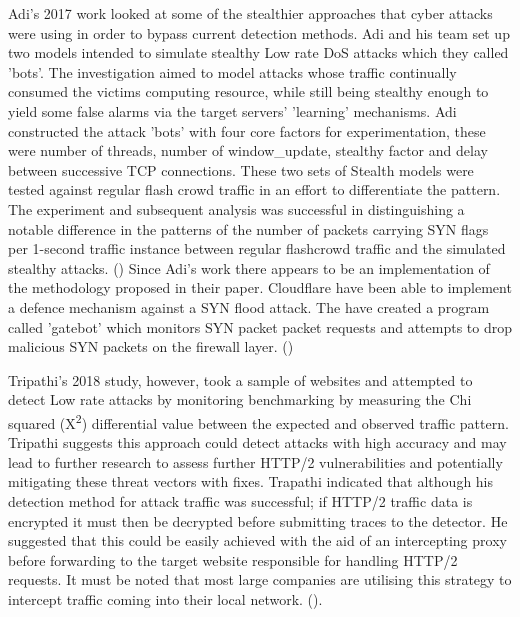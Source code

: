 Adi's 2017 work looked at some of the stealthier approaches that cyber attacks were using in order to bypass current detection methods. Adi and his team set up two models intended to simulate stealthy Low rate DoS attacks which they called 'bots'. The investigation aimed to model attacks whose traffic continually consumed the victims computing resource, while still being stealthy enough to yield some false alarms via the target servers' 'learning' mechanisms. Adi constructed the attack 'bots' with four core factors for experimentation, these were number of threads, number of window\_update, stealthy factor and delay between successive TCP connections. These two sets of Stealth models were tested against regular flash crowd traffic in an effort to differentiate the pattern. The experiment and subsequent analysis was successful in distinguishing a notable difference in the patterns of the number of packets carrying SYN flags per 1-second traffic instance between regular flashcrowd traffic and the simulated stealthy attacks. (\cite{adi2017stealthy}) Since Adi's work there appears to be an implementation of the methodology proposed in their paper. Cloudflare have been able to implement a defence mechanism against a SYN flood attack. The have created a program called 'gatebot' which monitors SYN packet packet requests and attempts to drop malicious SYN packets on the firewall layer. (\cite{CFSYN})

Tripathi's 2018 study, however, took a sample of websites and attempted to detect Low rate attacks by monitoring benchmarking by measuring the Chi squared (X\textsuperscript{\small2}) differential value between the expected and observed traffic pattern. Tripathi suggests this approach could detect attacks with high accuracy and may lead to further research to assess further HTTP/2 vulnerabilities and potentially mitigating these threat vectors with fixes. Trapathi indicated that although his detection method for attack traffic was successful; if HTTP/2 traffic data is encrypted it must then be decrypted before submitting traces to the detector. He suggested that this could be easily achieved with the aid of an intercepting proxy before forwarding to the target website responsible for handling HTTP/2 requests. It must be noted that most large companies are utilising this strategy to intercept traffic coming into their local network. (\cite{tripathi2018slow}). 
